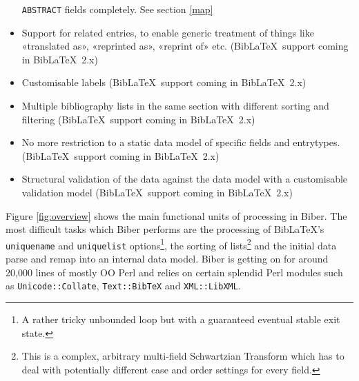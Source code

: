 \documentclass{ltxdockit}
\begin{document}
\begin{itemize}
  \verb+ABSTRACT+ fields completely. See section \ref{map}
\item Support for related entries, to enable generic treatment of things
  like «translated as», «reprinted as», «reprint of»
  etc. (Bib\LaTeX\ support coming in Bib\LaTeX\ 2.x)
\item Customisable labels (Bib\LaTeX\ support coming in
  Bib\LaTeX\ 2.x)
\item Multiple bibliography lists in the same section with different
  sorting and filtering (Bib\LaTeX\ support coming in Bib\LaTeX\ 2.x)
\item No more restriction to a static data model of specific fields and
  entrytypes. (Bib\LaTeX\ support coming in Bib\LaTeX\ 2.x)
\item Structural validation of the data against the data model with a
  customisable validation model (Bib\LaTeX\ support coming in
  Bib\LaTeX\ 2.x)
\end{itemize}

\noindent Figure \ref{fig:overview} shows the main functional units of
processing in Biber. The most difficult tasks which Biber
performs are the processing of Bib\LaTeX's \verb+uniquename+ and
\verb+uniquelist+ options\footnote{A rather tricky unbounded loop but with
  a guaranteed eventual stable exit state.}, the sorting of
lists\footnote{This is a complex, arbitrary multi-field Schwartzian
  Transform which has to deal with potentially different case and order
  settings for every field.} and the initial data parse and remap into an
internal data model. Biber is getting on for around 20,000 lines of
mostly OO Perl and relies on certain splendid Perl modules
such as \verb+Unicode::Collate+, \verb+Text::BibTeX+ and
\verb+XML::LibXML+.
\end{document}
